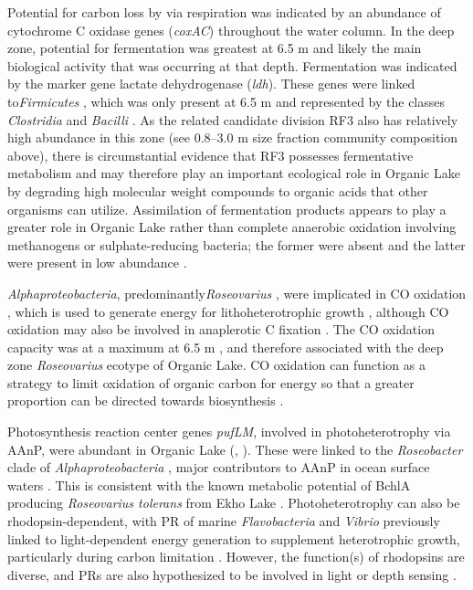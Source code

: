 Potential for carbon loss by via respiration was indicated by an abundance of cytochrome C oxidase genes (\emph{coxAC}) throughout the water column. 
In the deep zone, potential for fermentation was greatest at 6.5 m  and likely the main biological activity that was occurring at that depth. 
Fermentation was indicated by the marker gene lactate dehydrogenase (\emph{ldh}).
These genes were linked to\emph{Firmicutes} , which was only present at 6.5 m and represented by the classes \emph{Clostridia} and \emph{Bacilli} . 
As the related candidate division RF3 \cite{Tajima1999} also has relatively high abundance in this zone 
(see 0.8--3.0 \textmu{}m size fraction community composition above),
there is circumstantial evidence that RF3 possesses fermentative metabolism and may therefore play an important ecological role in Organic Lake by degrading high molecular weight compounds to organic acids that other organisms can utilize. 
Assimilation of fermentation products appears to play a greater role in Organic Lake rather than complete anaerobic oxidation involving methanogens or sulphate-reducing bacteria; the former were absent and the latter were present in low abundance . 

\emph{Alphaproteobacteria}, predominantly\emph{Roseovarius} , were implicated in CO oxidation , which is used to generate energy for lithoheterotrophic growth \cite{Moran2007b}, although CO oxidation may also be involved in anaplerotic C fixation \cite{Moran2007b}. 
The CO oxidation capacity was at a maximum at 6.5 m , and therefore associated with the deep zone \emph{Roseovarius} ecotype of Organic Lake. 
CO oxidation can function as a strategy to limit oxidation of organic carbon for energy so that a greater proportion can be directed towards biosynthesis \cite{Moran2007b}.

Photosynthesis reaction center genes \emph{pufLM}, involved in photoheterotrophy via \ac{AAnP}, were abundant in Organic Lake (, ). 
These were linked to the \emph{Roseobacter} clade of \emph{Alphaproteobacteria} , major contributors to \ac{AAnP} in ocean surface waters \cite{Beja2002, Moran2007b}. 
This is consistent with the known metabolic potential of \ac{BchlA} producing \emph{Roseovarius tolerans} from Ekho Lake \cite{Labrenz1999}. 
Photoheterotrophy can also be rhodopsin-dependent, with \ac{PR} of marine \emph{Flavobacteria} and \emph{Vibrio} previously linked to light-dependent energy generation to supplement heterotrophic growth, particularly during carbon limitation \cite{Gomez-Consarnau2007, Gomez-Consarnau2010}. 
However, the function(s) of rhodopsins are diverse, and \acp{PR} are also hypothesized to be involved in light or depth sensing \cite{Fuhrman2008}. 

